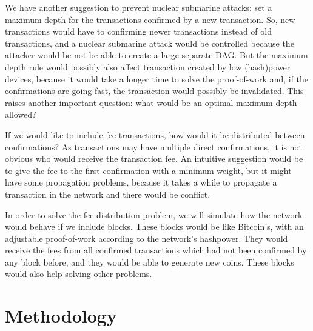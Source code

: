 We have another suggestion to prevent nuclear submarine attacks: set a maximum depth for the transactions confirmed by a new transaction. So, new transactions would have to confirming newer transactions instead of old transactions, and a nuclear submarine attack would be controlled because the attacker would be not be able to create a large separate DAG. But the maximum depth rule would possibly also affect transaction created by low (hash)power devices, because it would take a longer time to solve the proof-of-work and, if the confirmations are going fast, the transaction would possibly be invalidated. This raises another important question: what would be an optimal maximum depth allowed?

If we would like to include fee transactions, how would it be distributed between confirmations? As transactions may have multiple direct confirmations, it is not obvious who would receive the transaction fee. An intuitive suggestion would be to give the fee to the first confirmation with a minimum weight, but it might have some propagation problems, because it takes a while to propagate a transaction in the network and there would be conflict.

In order to solve the fee distribution problem, we will simulate how the network would behave if we include blocks. These blocks would be like Bitcoin's, with an adjustable proof-of-work according to the network's hashpower. They would receive the fees from all confirmed transactions which had not been confirmed by any block before, and they would be able to generate new coins. These blocks would also help solving other problems.


\chapter{Methodology}

